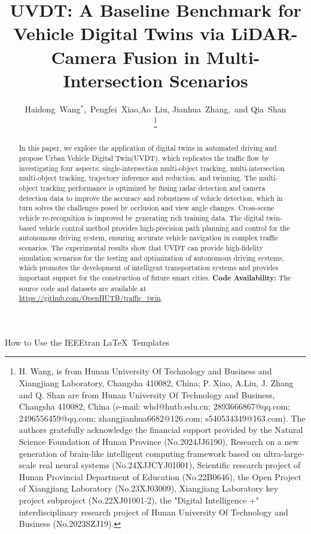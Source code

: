 \documentclass[lettersize,journal]{IEEEtran}
\begin{document}
\title{UVDT: A Baseline Benchmark for Vehicle Digital Twins via LiDAR-Camera Fusion in Multi-Intersection Scenarios}
\author{Haidong~Wang\(^*\),~Pengfei~Xiao,Ao~Liu, Jianhua~Zhang,~and Qia~Shan

\thanks{H. Wang, is from Hunan University Of Technology and Business and Xiangjiang Laboratory, Changsha 410082, China; P. Xiao, A.Liu, J. Zhang and Q. Shan are from Hunan University Of Technology and Business, Changsha 410082, China (e-mail: whd@hutb.edu.cn; 2893666867@qq.com; 2496556459@qq.com; zhangjianhua6682@126.com; s540534349@163.com). The authors gratefully acknowledge the financial support provided by the Natural Science Foundation of Hunan Province (No.2024JJ6190), Research on a new generation of brain-like intelligent computing framework based on ultra-large-scale real neural systems (No.24XJJCYJ01001), Scientific research project of Hunan Provincial Department of Education (No.22B0646), the Open Project of Xiangjiang Laboratory (No.23XJ03009), Xiangjiang Laboratory key project subproject (No.22XJ01001-2), the "Digital Intelligence +" interdisciplinary research project of Hunan University Of Technology and Business (No.2023SZJ19).}}

%
{How to Use the IEEEtran \LaTeX \ Templates}

\maketitle

\begin{abstract}
In this paper, we explore the application of digital twins in automated driving and propose Urban Vehicle Digital Twin(UVDT), which replicates the traffic flow by investigating four aspects: single-intersection multi-object tracking, multi-intersection multi-object tracking, trajectory inference and reduction, and twinning. 
The multi-object tracking performance is optimized by fusing radar detection and camera detection data to improve the accuracy and robustness of vehicle detection, which in turn solves the challenges posed by occlusion and view angle changes. 
Cross-scene vehicle re-recognition is improved by generating rich training data. 
The digital twin-based vehicle control method provides high-precision path planning and control for the autonomous driving system, ensuring accurate vehicle navigation in complex traffic scenarios. 
The experimental results show that UVDT can provide high-fidelity simulation scenarios for the testing and optimization of autonomous driving systems, which promotes the development of intelligent transportation systems and provides important support for the construction of future smart cities.
\noindent \textbf{Code Availability:} The source code and datasets are available at \url{https://github.com/OpenHUTB/traffic_twin}.
\end{abstract}
\end{document}
